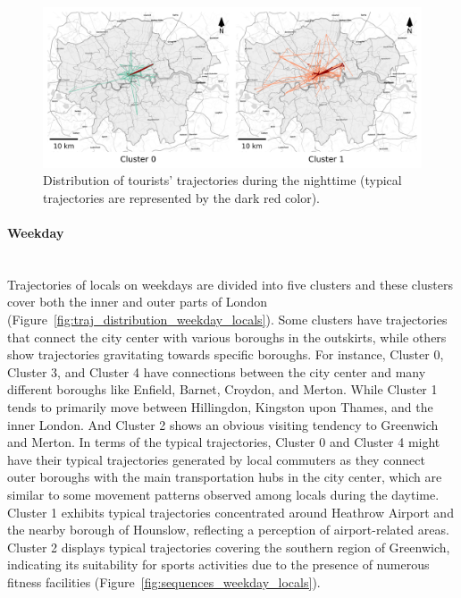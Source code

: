 \documentclass{article}
\newcommand{\subsubsubsection}[1]{\paragraph{#1}\mbox{}\\}
\theoremstyle{remark}
\begin{document}
\begin{figure}[!h]
\centering
\includegraphics[width=1\textwidth]{figures/traj_distribution_nighttime_tourists.png}
\caption{\label{fig:traj_distribution_nighttime_tourists}Distribution of tourists' trajectories during the nighttime (typical trajectories are represented by the dark red color).}
\end{figure}


\subsubsubsection{Weekday}

Trajectories of locals on weekdays are divided into five clusters and these clusters cover both the inner and outer parts of London (Figure~\ref{fig:traj_distribution_weekday_locals}). Some clusters have trajectories that connect the city center with various boroughs in the outskirts, while others show trajectories gravitating towards specific boroughs. For instance, Cluster 0, Cluster 3, and Cluster 4 have connections between the city center and many different boroughs like Enfield, Barnet, Croydon, and Merton. While Cluster 1 tends to primarily move between Hillingdon, Kingston upon Thames, and the inner London. And Cluster 2 shows an obvious visiting tendency to Greenwich and Merton. In terms of the typical trajectories, Cluster 0 and Cluster 4 might have their typical trajectories generated by local commuters as they connect outer boroughs with the main transportation hubs in the city center, which are similar to some movement patterns observed among locals during the daytime. Cluster 1 exhibits typical trajectories concentrated around Heathrow Airport and the nearby borough of Hounslow, reflecting a perception of airport-related areas. Cluster 2 displays typical trajectories covering the southern region of Greenwich, indicating its suitability for sports activities due to the presence of numerous fitness facilities (Figure~\ref{fig:sequences_weekday_locals}).
\end{document}
